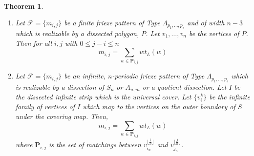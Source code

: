 \documentclass[12pt]{article}
\newtheorem{theorem}{Theorem}
\theoremstyle{remark}
\newcommand*{\pathset}[2]{\mathbf{P}_{#1,#2}}
\begin{document}
\begin{theorem}\label{thm:LocalWeight}
\begin{enumerate}
    \item Let $\mathcal{F} = \{m_{i,j}\}$ be a finite frieze pattern of Type $\Lambda_{p_1,\ldots,p_s}$ and of width $n-3$ which is realizable by a dissected polygon, $P$. Let $v_1,\ldots,v_n$ be the vertices of $P$.  Then for all $i,j$ with $0 \leq j - i \leq n$ \[
    m_{i,j} = \sum_{w \in \pathset{i}{j}} wt_L(w)
    \]
    \item Let $\mathcal{F} = \{m_{i,j}\}$ be an infinite, $n$-periodic frieze pattern of Type $\Lambda_{p_1,\ldots,p_s}$ which is realizable by a dissection of $S_n$ or $A_{n,m}$ or a quotient dissection. Let $I$ be the dissected infinite strip which is the universal cover.  Let $\{v_i^k\}$ be the infinite family of vertices of $I$ which map to the vertices on the outer boundary of $S$ under the covering map. Then,\[
    m_{i,j} = \sum_{w \in \pathset{i}{j}} wt_L(w)
    \]
    where $\pathset{i}{j}$ is the set of matchings between $v_{i_n}^{\lfloor \frac{i}{n} \rfloor}$ and $v_{j_n}^{\lfloor \frac{j}{n} \rfloor}$.
\end{enumerate}
\end{theorem}
\end{document}
